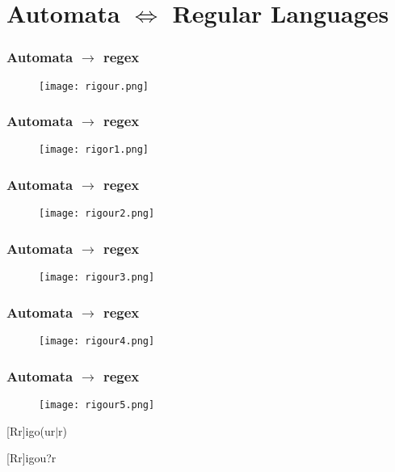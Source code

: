 \documentclass{beamer}
\begin{document}

\section*{Automata $\iff$ Regular Languages}

\begin{frame}
	\frametitle{Automata $\rightarrow $ regex}
	\begin{figure}
	\centering \texttt{[image: rigour.png]}
	\end{figure}
\end{frame}	
	

\begin{frame}
	\frametitle{Automata $\rightarrow $ regex}
	\begin{figure}
	\centering \texttt{[image: rigor1.png]}
	\end{figure}
\end{frame}	
		

\begin{frame}
	\frametitle{Automata $\rightarrow $ regex}
	\begin{figure}
	\centering \texttt{[image: rigour2.png]}
	\end{figure}
\end{frame}	

\begin{frame}
	\frametitle{Automata $\rightarrow $ regex}
	\begin{figure}
	\centering \texttt{[image: rigour3.png]}
	\end{figure}
\end{frame}	

\begin{frame}
	\frametitle{Automata $\rightarrow $ regex}
	\begin{figure}
	\centering \texttt{[image: rigour4.png]}
	\end{figure}
\end{frame}			
	
	
\begin{frame}
	\frametitle{Automata $\rightarrow $ regex}
	\begin{figure}
	\centering \texttt{[image: rigour5.png]}
	\end{figure}
	
	\pause 
	
	[Rr]igo(ur$|$r)
	
	\pause
		
	[Rr]igou?r \\
\end{frame}			
\end{document}
